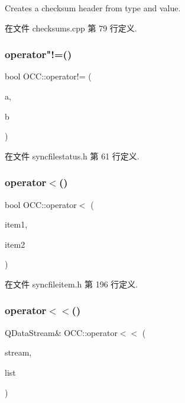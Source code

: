 Creates a checksum header from type and value. 



在文件 checksums.\+cpp 第 79 行定义.

\mbox{\label{namespace_o_c_c_aa58b3940b89f2846a59bab7eff10103a}} 
\subsubsection{\texorpdfstring{operator"!=()}{operator!=()}}
{\footnotesize\ttfamily bool O\+C\+C\+::operator!= (\begin{DoxyParamCaption}\item[{const \hyperlink{class_o_c_c_1_1_sync_file_status}{Sync\+File\+Status} \&}]{a,  }\item[{const \hyperlink{class_o_c_c_1_1_sync_file_status}{Sync\+File\+Status} \&}]{b }\end{DoxyParamCaption})}



在文件 syncfilestatus.\+h 第 61 行定义.

\mbox{\label{namespace_o_c_c_ac314fa3234913fc464eea7a8e2b84d74}} 
\subsubsection{\texorpdfstring{operator$<$()}{operator<()}}
{\footnotesize\ttfamily bool O\+C\+C\+::operator$<$ (\begin{DoxyParamCaption}\item[{const \hyperlink{namespace_o_c_c_acb6b0db82893659fbd0c98d3c5b8e2b8}{Sync\+File\+Item\+Ptr} \&}]{item1,  }\item[{const \hyperlink{namespace_o_c_c_acb6b0db82893659fbd0c98d3c5b8e2b8}{Sync\+File\+Item\+Ptr} \&}]{item2 }\end{DoxyParamCaption})}



在文件 syncfileitem.\+h 第 196 行定义.

\mbox{\label{namespace_o_c_c_ae2249ddb2048e73e33118c1d07a9c716}} 
\subsubsection{\texorpdfstring{operator$<$$<$()}{operator<<()}}
{\footnotesize\ttfamily Q\+Data\+Stream\& O\+C\+C\+::operator$<$$<$ (\begin{DoxyParamCaption}\item[{Q\+Data\+Stream \&}]{stream,  }\item[{const Q\+List$<$ Q\+Network\+Cookie $>$ \&}]{list }\end{DoxyParamCaption})}



